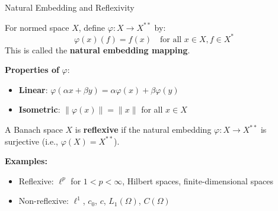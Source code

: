\documentclass[aspectratio=169,10pt]{beamer}
\begin{document}
\begin{frame}{Natural Embedding and Reflexivity}
  \begin{definition}
    For normed space $X$, define $\varphi : X \to X^{**}$ by:
    $$\varphi(x)(f) = f(x) \quad \text{for all } x \in X, f \in X^*$$
    This is called the \textbf{natural embedding mapping}.
  \end{definition}

  \vspace{0.3cm}
  \textbf{Properties of } $\varphi$:
  \begin{itemize}
    \item \textbf{Linear}: $\varphi(\alpha x + \beta y) = \alpha \varphi(x) + \beta \varphi(y)$
    \item \textbf{Isometric}: $\|\varphi(x)\| = \|x\|$ for all $x \in X$
  \end{itemize}

  \vspace{0.3cm}
  \begin{definition}
    A Banach space $X$ is \textbf{reflexive} if the natural embedding $\varphi : X \to X^{**}$ is surjective (i.e., $\varphi(X) = X^{**}$).
  \end{definition}

  \vspace{0.3cm}
  \textbf{Examples:}
  \begin{itemize}
    \item Reflexive: $\ell^p$ for $1 < p < \infty$, Hilbert spaces, finite-dimensional spaces
    \item Non-reflexive: $\ell^1$, $c_0$, $c$, $L_1(\Omega)$, $C(\Omega)$
  \end{itemize}
\end{frame}
\end{document}
